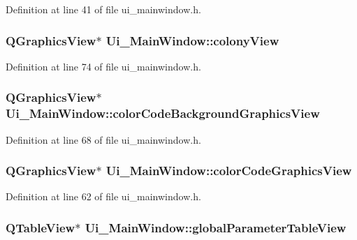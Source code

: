 \-Definition at line 41 of file ui\-\_\-mainwindow.\-h.

\hypertarget{class_ui___main_window_aadc961224465f9981b865ee8d392a34d}{
\subsubsection[{colony\-View}]{\setlength{\rightskip}{0pt plus 5cm}\-Q\-Graphics\-View$\ast$ {\bf \-Ui\-\_\-\-Main\-Window\-::colony\-View}}}\label{class_ui___main_window_aadc961224465f9981b865ee8d392a34d}


\-Definition at line 74 of file ui\-\_\-mainwindow.\-h.

\hypertarget{class_ui___main_window_a6514b2e16b9ea2f879bde5976b215e9b}{
\subsubsection[{color\-Code\-Background\-Graphics\-View}]{\setlength{\rightskip}{0pt plus 5cm}\-Q\-Graphics\-View$\ast$ {\bf \-Ui\-\_\-\-Main\-Window\-::color\-Code\-Background\-Graphics\-View}}}\label{class_ui___main_window_a6514b2e16b9ea2f879bde5976b215e9b}


\-Definition at line 68 of file ui\-\_\-mainwindow.\-h.

\hypertarget{class_ui___main_window_a9d358977cfd4428817e8ec8e76084d5a}{
\subsubsection[{color\-Code\-Graphics\-View}]{\setlength{\rightskip}{0pt plus 5cm}\-Q\-Graphics\-View$\ast$ {\bf \-Ui\-\_\-\-Main\-Window\-::color\-Code\-Graphics\-View}}}\label{class_ui___main_window_a9d358977cfd4428817e8ec8e76084d5a}


\-Definition at line 62 of file ui\-\_\-mainwindow.\-h.

\hypertarget{class_ui___main_window_a3baa50bd3a556afb670087812b6819a8}{
\subsubsection[{global\-Parameter\-Table\-View}]{\setlength{\rightskip}{0pt plus 5cm}\-Q\-Table\-View$\ast$ {\bf \-Ui\-\_\-\-Main\-Window\-::global\-Parameter\-Table\-View}}}\label{class_ui___main_window_a3baa50bd3a556afb670087812b6819a8}


